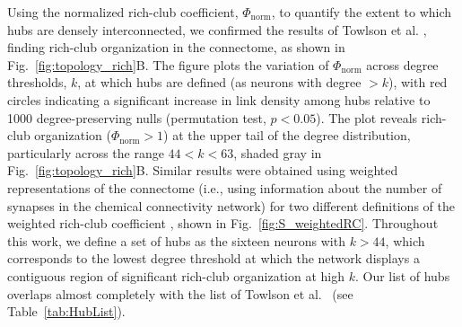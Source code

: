 \documentclass[10pt,letterpaper]{article}
\begin{document}
Using the normalized rich-club coefficient, $\Phi_\mathrm{norm}$, to quantify the extent to which hubs are densely interconnected, we confirmed the results of Towlson et al. \cite{Towlson2013}, finding rich-club organization in the connectome, as shown in Fig.~\ref{fig:topology_rich}B.
The figure plots the variation of $\Phi_\mathrm{norm}$ across degree thresholds, $k$, at which hubs are defined (as neurons with degree $>k$), with red circles indicating a significant increase in link density among hubs relative to 1000 degree-preserving nulls (permutation test, $p < 0.05$).
The plot reveals rich-club organization ($\Phi_\mathrm{norm} > 1$) at the upper tail of the degree distribution, particularly across the range $44 < k < 63$, shaded gray in Fig.~\ref{fig:topology_rich}B.
Similar results were obtained using weighted representations of the connectome (i.e., using information about the number of synapses in the chemical connectivity network) for two different definitions of the weighted rich-club coefficient \cite{Opsahl2008}, shown in Fig.~\ref{fig:S_weightedRC}.
Throughout this work, we define a set of hubs as the sixteen neurons with $k > 44$, which corresponds to the lowest degree threshold at which the network displays a contiguous region of significant rich-club organization at high $k$.
Our list of hubs overlaps almost completely with the list of Towlson et al.~\cite{Towlson2013} (see Table~\ref{tab:HubList}).
\end{document}
